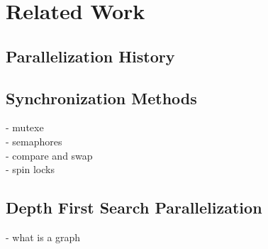 \chapter{Related Work}

\section{Parallelization History}
\section{Synchronization Methods}
- mutexe\\
- semaphores\\
- compare and swap\\
- spin locks\\
\section{Depth First Search Parallelization}
- what is a graph